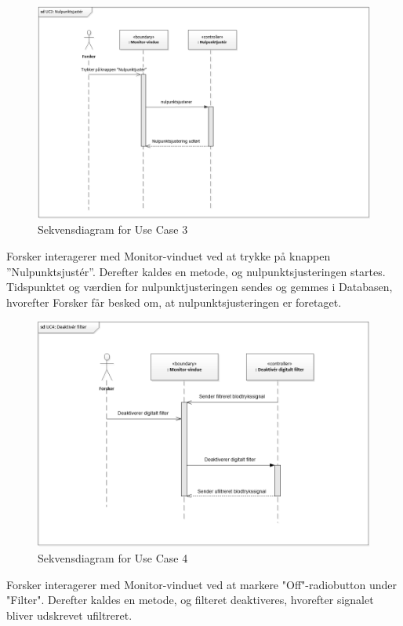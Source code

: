 \begin{figure}[H]
	\centering
	\includegraphics[width=1\textwidth]{Figurer/UC3_SD}
	\caption{Sekvensdiagram for Use Case 3}
\end{figure}

Forsker interagerer med Monitor-vinduet ved at trykke på knappen ”Nulpunktsjustér”. Derefter kaldes en metode, og nulpunktsjusteringen startes. Tidspunktet og værdien for nulpunktjusteringen sendes og gemmes i Databasen, hvorefter Forsker får besked om, at nulpunktsjusteringen er foretaget. 

\begin{figure}[H]
	\centering
	\includegraphics[width=1\textwidth]{Figurer/UC4_SD}
	\caption{Sekvensdiagram for Use Case 4}
\end{figure}

Forsker interagerer med Monitor-vinduet ved at markere "Off"\--radiobutton under "Filter". Derefter kaldes en metode, og filteret deaktiveres, hvorefter signalet bliver udskrevet ufiltreret.

